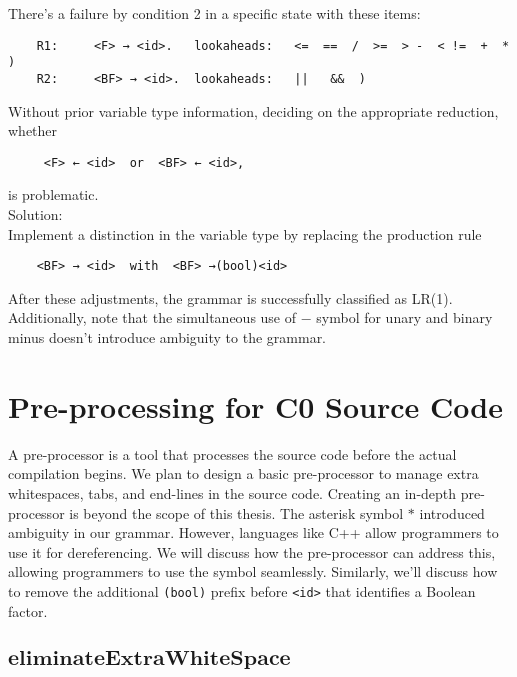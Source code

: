 \begin{enumerate}
    There’s a failure by condition 2 in a specific state with these items:
    \begin{verbatim}
    R1:		<F> → <id>.   lookaheads:   <=  ==  /  >=  > -  < !=  +  *  )
    R2:		<BF> → <id>.  lookaheads:   ||   &&  )
    \end{verbatim}
    Without prior variable type information, deciding on the appropriate reduction, whether
    \begin{verbatim}
     <F> ← <id>  or  <BF> ← <id>,
    \end{verbatim}
    is problematic.\\

    Solution: \\
    Implement a distinction in the variable type by replacing the production rule
    \begin{verbatim}
    <BF> → <id>  with  <BF> →(bool)<id>
    \end{verbatim}

    After these adjustments, the grammar is successfully classified as LR(1). Additionally, note that the simultaneous use of \(-\) symbol for unary and binary minus doesn’t introduce ambiguity to the grammar.
\end{enumerate}


\newpage

\section{Pre-processing for C0 Source Code}\label{sec:Pre-processing for C0 Source Code}

A pre-processor is a tool that processes the source code before the actual compilation begins. We plan to design a basic pre-processor to manage extra whitespaces, tabs, and end-lines in the source code. Creating an in-depth pre-processor is beyond the scope of this thesis. The asterisk symbol \(\ast\) introduced ambiguity in our grammar. However, languages like C++ allow programmers to use it for dereferencing. We will discuss how the pre-processor can address this, allowing programmers to use the symbol seamlessly. Similarly, we'll discuss how to remove the additional \texttt{(bool)} prefix before \texttt{<id>} that identifies a Boolean factor.

\vspace{10pt}

\subsection{\(\boldsymbol{eliminateExtraWhiteSpace}\)}

